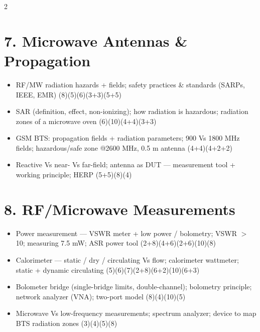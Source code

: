 \documentclass[10pt]{article}
\begin{document}
\begin{multicols}{2}
\section*{7. Microwave Antennas \& Propagation}
\begin{itemize}
  \item RF/MW radiation hazards + fields; safety practices \& standards (SARPs, IEEE, EMR) \hfill (8)(5)(6)(3+3)(5+5)
  \item SAR (definition, effect, non-ionizing); how radiation is hazardous; radiation zones of a microwave oven \hfill (6)(10)(4+4)(3+3)
  \item GSM BTS: propagation fields + radiation parameters; 900 Vs 1800 MHz fields; hazardous/safe zone @2600 MHz, 0.5 m antenna \hfill (4+4)(4+2+2)
  \item Reactive Vs near- Vs far-field; antenna as DUT --- measurement tool + working principle; HERP \hfill (5+5)(8)(4)
\end{itemize}

\section*{8. RF/Microwave Measurements}
\begin{itemize}
  \item Power measurement --- VSWR meter + low power / bolometry; VSWR $>$ 10; measuring 7.5 mW; ASR power tool \hfill (2+8)(4+6)(2+6)(10)(8)
  \item Calorimeter --- static / dry / circulating Vs flow; calorimeter wattmeter; static + dynamic circulating \hfill (5)(6)(7)(2+8)(6+2)(10)(6+3)
  \item Bolometer bridge (single-bridge limits, double-channel); bolometry principle; network analyzer (VNA); two-port model \hfill (8)(4)(10)(5)
  \item Microwave Vs low-frequency measurements; spectrum analyzer; device to map BTS radiation zones \hfill (3)(4)(5)(8)
\end{itemize}

\end{multicols}
\end{document}
